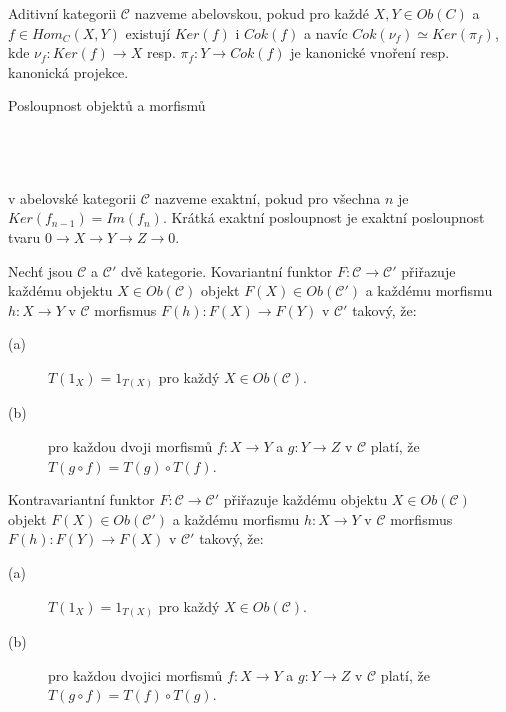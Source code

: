     \begin{dfn}
      Aditivní kategorii $\mathcal C$ nazveme abelovskou, pokud pro každé $X,Y\in Ob(C)$ 
        a $f\in Hom_C(X,Y)$ existují $Ker(f)$ i $Cok(f)$ a navíc 
        $Cok(\nu_f)\simeq Ker(\pi_f)$, kde $\nu_f:Ker(f)\rightarrow X$ resp. $\pi_f:Y\rightarrow Cok(f)$ 
        je kanonické vnoření resp. kanonická projekce.
    \end{dfn}
    
    \begin{dfn}
      Posloupnost objektů a morfismů \\\\
            \centerline{}\\\\      v abelovské kategorii $\mathcal C$ nazveme exaktní, pokud pro 
             všechna
      $n$ je $Ker(f_{n-1})=Im(f_n)$. Krátká exaktní posloupnost je exaktní 
      posloupnost tvaru $0\to X\to Y\to Z\to 0$.
    \end{dfn}
    
    \begin{dfn}
      Nechť jsou $\mathcal C$ a $\mathcal C'$ dvě kategorie.  Kovariantní funktor 
      $F:\mathcal C \to \mathcal C'$ přiřazuje každému 
      objektu $X\in Ob(\mathcal C)$ objekt $F(X)\in Ob(\mathcal C')$ a každému 
      morfismu $h:X\to Y$ v $\mathcal C$ morfismus $F(h):F(X)\to F(Y)$ v $\mathcal C'$ 
      takový, že: 
      \begin{description}
        \item[(a)] $T(1_X)=1_{T(X)}$ pro  každý $X\in Ob(\mathcal C)$.
        \item[(b)] pro každou dvoji morfismů $f:X\to Y$ a $g:Y\to Z$ v $\mathcal C$ 
        platí, že $T(g\circ f)=T(g)\circ T(f)$.
      \end{description}
      Kontravariantní funktor $F:\mathcal C \to \mathcal C'$ přiřazuje každému 
      objektu $X\in Ob(\mathcal C)$ objekt $F(X)\in Ob(\mathcal C')$ a každému 
      morfismu $h:X\to Y$ v $\mathcal C$ morfismus $F(h):F(Y)\to F(X)$ v $\mathcal C'$ 
      takový, že: 
      \begin{description}
        \item[(a)] $T(1_X)=1_{T(X)}$ pro  každý $X\in Ob(\mathcal C)$.
        \item[(b)] pro každou dvojici morfismů $f:X\to Y$ a $g:Y\to Z$ v $\mathcal C$ 
        platí, že $T(g\circ f)=T(f)\circ T(g)$.
      \end{description}
    \end{dfn}
    

